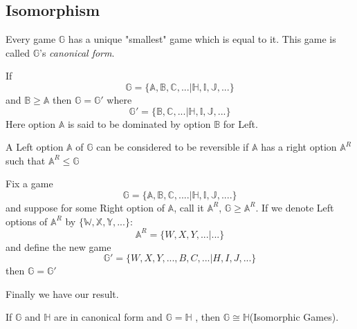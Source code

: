 \documentclass[12pt]{beamer}
\begin{document}
\subsection{Isomorphism}

\begin{frame}
\begin{definition}
Every game $\mathbb{G}$ has a unique "smallest" game which is equal to it. This game is called $\mathbb{G}$'s \textit{canonical form}.
\end{definition}
\pause
\begin{theorem}
If $$\mathbb{G}=\{\mathbb{A,B,C,...|H,I,J,...}\}$$ and $\mathbb{B \geq A}$
then $\mathbb{G=G'}$ where
$$\mathbb{G'=}\{\mathbb{B,C,...|H,I,J,...}\}$$\break
Here option $\mathbb{A}$ is said to be dominated by option $\mathbb{B}$
for Left.
\end{theorem}
\pause
\begin{definition}
A Left option $\mathbb{A}$ of $\mathbb{G}$ can be considered to be
reversible if $\mathbb{A}$ has a right option $\mathbb{A^\textit{R}}$ such
that $\mathbb{A^\textit{R}} \leq \mathbb{G}$
\end{definition}
\end{frame}

\begin{frame}
\begin{theorem}
Fix a game$$\mathbb{G}=\{\mathbb{A,B,C,....|H,I,J,....}\}$$ and suppose
for some Right option of $\mathbb{A}$, call it $\mathbb{A^\textit{R}}$,
$\mathbb{G} \geq \mathbb{A^\textit{R}}$. If we denote Left options of
$\mathbb{A^\textit{R}}$ by
$\{\mathbb{W,X,Y,...}\}$:$$\mathbb{A^\textit{R}}=\{W,X,Y,...|...\}$$ and
define the new game $$\mathbb{G'=}\{W,X,Y,...,B,C,...|H,I,J,...\}$$ then
$\mathbb{G=G' }$
\end{theorem}
\pause
\smiley
\smiley
\smiley
\smiley
Finally we have our result.
\smiley
\smiley
\smiley
\smiley
\begin{theorem}
If $\mathbb{G}$ and $\mathbb{H}$ are in canonical form and  $\mathbb{G = H}$ , then $\mathbb{G \cong H}$(Isomorphic Games).
\end{theorem}
\end{frame}
\end{document}
